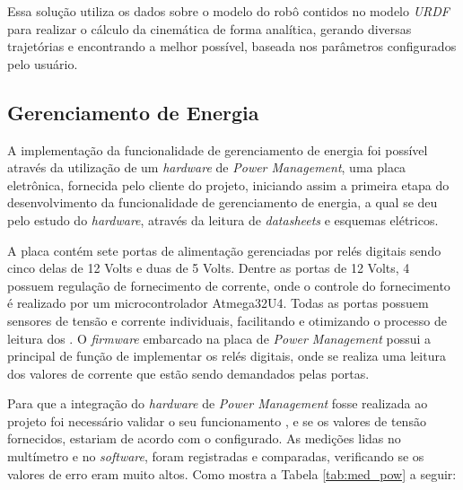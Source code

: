 Essa solução utiliza os dados sobre o modelo do robô contidos no modelo \textit{URDF} para realizar o cálculo da cinemática de forma analítica, gerando diversas trajetórias e encontrando a melhor possível, baseada nos parâmetros configurados pelo usuário.

\subsection{Gerenciamento de Energia}\label{sec:geren_ene}
A implementação da funcionalidade de gerenciamento de energia foi possível através da utilização de um \textit{hardware} de \textit{Power Management}, uma placa eletrônica, fornecida pelo cliente do projeto, iniciando assim a primeira etapa do desenvolvimento da funcionalidade de gerenciamento de energia, a qual se deu pelo estudo do \textit{hardware}, através da leitura de \textit{datasheets} e esquemas elétricos. 

A placa contém sete portas de alimentação gerenciadas por relés digitais sendo cinco delas de 12 Volts e duas de 5 Volts. Dentre as portas de 12 Volts, 4 possuem regulação de fornecimento de corrente, onde o controle do fornecimento é realizado por um microcontrolador Atmega32U4. Todas as portas possuem sensores de tensão e corrente individuais, facilitando e otimizando o processo de leitura dos . O \textit{firmware} embarcado na placa de \textit{Power Management} possui a principal de função de implementar os relés digitais, onde se realiza uma leitura dos valores de corrente que estão sendo demandados pelas portas. 

Para que a integração do \textit{hardware} de \textit{Power Management} fosse realizada ao projeto foi necessário validar o seu funcionamento , e se os valores de tensão fornecidos, estariam de acordo com o configurado. As medições lidas no multímetro e no \textit{software}, foram registradas e comparadas, verificando se os valores de erro eram muito altos. Como mostra a Tabela \ref{tab:med_pow} a seguir:

